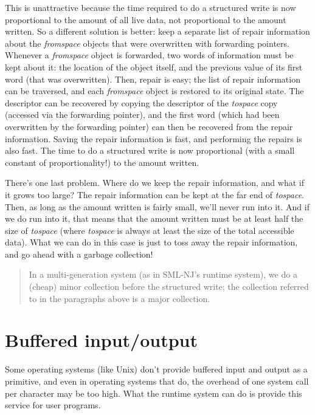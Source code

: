 This is unattractive because the time required to do a structured write
is now proportional to the amount of all live data, not proportional
to the amount written.  So a different solution is better:  keep
a separate list of
repair
information about the {\em fromspace} objects that were overwritten with
forwarding pointers.  Whenever a {\em fromspace} object is forwarded,
two words of information must be kept about it:  the location of the
object itself, and
the previous value
of its first word (that was overwritten).  Then, repair is easy;
the list of repair information can be traversed, and each {\em fromspace}
object is restored to its original state.
The descriptor can be recovered by copying the descriptor of the
{\em tospace} copy (accessed via the forwarding pointer), and the first
word (which had been overwritten by the forwarding pointer) can then
be recovered from the repair information.
Saving the repair information is fast, and performing the repairs is also
fast.  The time to do a structured write is now proportional (with a small
constant of proportionality!) to the amount written.

There's one last problem.  Where do we keep the repair information, and
what if it grows too large?  The repair information can be kept at the
far end of {\em tospace}.  Then, as long as the amount written is fairly small,
we'll never run into it.  And if we do run into it, that means that
the amount written must be at least half the size of {\em tospace} (where {\em tospace}
is always at least the size of the total accessible data).  What we can do
in this case is just to toss away the repair information, and go ahead
with a garbage collection!

\begin{quotation}
{\small In a multi-generation system (as in SML-NJ's runtime system),
we do a (cheap) minor collection before the structured write; the collection
referred to in the paragraphs above is a major collection.
}
\end{quotation}
\section{Buffered input/output}
\label{buffered}

Some operating systems (like Unix) don't provide buffered
input and output
as a primitive, and even in operating systems that do, the overhead
of one system call per character may be too high.  What the runtime
system can do is provide this service for user programs.

